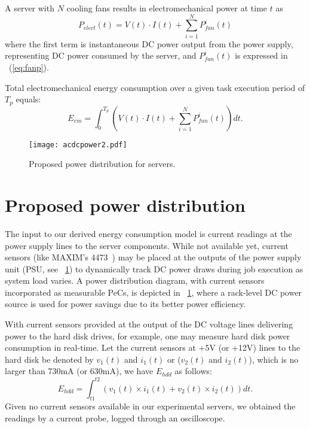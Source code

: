 A server with $N$ cooling fans results in electromechanical power at time $t$ as
\begin{equation*}
\label{eq:electp}
P_{elect}(t) =  V(t) \cdot I(t) + \sum_{i=1}^NP_{fan}^{i}(t)
\end{equation*} 
where the first term is instantaneous DC power output from the power supply,
representing DC power consumed by the server, and
$P_{fan}^{i}(t)$ is expressed in \equationname~(\ref{eq:fanp}).

Total electromechanical energy consumption over a given task execution
period of $T_{p}$ equals:
\begin{equation*}
\label{eq:elect}
E_{em} =  \int^{T_{p}}_0 \left(V(t) \cdot I(t) + \sum_{i=1}^NP_{fan}^{i}(t)\right)dt.
\end{equation*} 
\begin{figure}[tp]
\begin{center}
     \texttt{[image: acdcpower2.pdf]}
     \caption{Proposed power distribution for servers.}
     \label{fig:psu}
\end{center}
\end{figure}
\section{Proposed power distribution}
\label{sec:powerdist}
The input to our derived energy consumption model is current readings at
the power supply lines to the server components.  While not available
yet, current sensors (like MAXIM's 4473~\cite{maxim2006}) may be placed
at the outputs of the power supply unit (PSU, see
\figurename~\ref{fig:psu}) to dynamically track DC power draws during
job execution as system load varies.  A power distribution diagram, with
current sensors incorporated as measurable PeCs, is depicted in
\figurename~\ref{fig:psu}, where a rack-level DC power source is used
for power savings due to its better power efficiency.

With current sensors provided at the output of the DC voltage lines
delivering power to the hard disk drives, for example, one may measure
hard disk power consumption in real-time.  Let the current sensors at
+5V (or +12V) lines to the hard disk be denoted by $v_1(t)$ and $i_1(t)$
or ($v_2(t)$ and $i_2(t)$), which is no larger than 730mA (or 630mA),
we have $E_{hdd}$ as follows:
\begin{equation*}
\label{eq:hddpwr2}
E_{hdd} =  \int_{t1}^{t2} \left( v_1(t)\times i_1(t) + v_2(t)\times i_2(t) \right) dt.
\end{equation*}
Given no current sensors available in our experimental servers, we
obtained the readings by a current probe, logged through an
oscilloscope.

